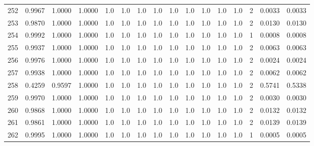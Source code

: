 \begin{tabular}{lrrrrrrrrrrrrrrr}
252 &      0.9967 &  1.0000 &  1.0000 &     1.0 &     1.0 &     1.0 &     1.0 &     1.0 &     1.0 &     1.0 &      1.0 &        1.0 &      2 &                    0.0033 &                     0.0033 \\
253 &      0.9870 &  1.0000 &  1.0000 &     1.0 &     1.0 &     1.0 &     1.0 &     1.0 &     1.0 &     1.0 &      1.0 &        1.0 &      2 &                    0.0130 &                     0.0130 \\
254 &      0.9992 &  1.0000 &  1.0000 &     1.0 &     1.0 &     1.0 &     1.0 &     1.0 &     1.0 &     1.0 &      1.0 &        1.0 &      1 &                    0.0008 &                     0.0008 \\
255 &      0.9937 &  1.0000 &  1.0000 &     1.0 &     1.0 &     1.0 &     1.0 &     1.0 &     1.0 &     1.0 &      1.0 &        1.0 &      2 &                    0.0063 &                     0.0063 \\
256 &      0.9976 &  1.0000 &  1.0000 &     1.0 &     1.0 &     1.0 &     1.0 &     1.0 &     1.0 &     1.0 &      1.0 &        1.0 &      2 &                    0.0024 &                     0.0024 \\
257 &      0.9938 &  1.0000 &  1.0000 &     1.0 &     1.0 &     1.0 &     1.0 &     1.0 &     1.0 &     1.0 &      1.0 &        1.0 &      2 &                    0.0062 &                     0.0062 \\
258 &      0.4259 &  0.9597 &  1.0000 &     1.0 &     1.0 &     1.0 &     1.0 &     1.0 &     1.0 &     1.0 &      1.0 &        1.0 &      2 &                    0.5741 &                     0.5338 \\
259 &      0.9970 &  1.0000 &  1.0000 &     1.0 &     1.0 &     1.0 &     1.0 &     1.0 &     1.0 &     1.0 &      1.0 &        1.0 &      2 &                    0.0030 &                     0.0030 \\
260 &      0.9868 &  1.0000 &  1.0000 &     1.0 &     1.0 &     1.0 &     1.0 &     1.0 &     1.0 &     1.0 &      1.0 &        1.0 &      2 &                    0.0132 &                     0.0132 \\
261 &      0.9861 &  1.0000 &  1.0000 &     1.0 &     1.0 &     1.0 &     1.0 &     1.0 &     1.0 &     1.0 &      1.0 &        1.0 &      2 &                    0.0139 &                     0.0139 \\
262 &      0.9995 &  1.0000 &  1.0000 &     1.0 &     1.0 &     1.0 &     1.0 &     1.0 &     1.0 &     1.0 &      1.0 &        1.0 &      1 &                    0.0005 &                     0.0005 \\

\end{tabular}
